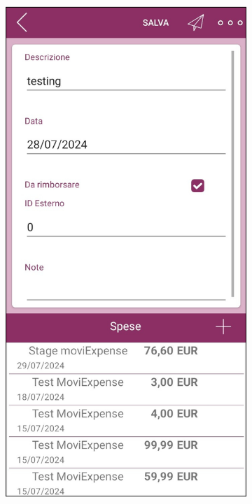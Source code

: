 \begin{figure}[H]
    \begin{subfigure}{.5\textwidth}
        \centering
        \includegraphics[width=.65\columnwidth]{images/screenshot/old/notaEditable.png}\vspace{2mm}
    \end{subfigure}
    \begin{subfigure}{.5\textwidth}
        \centering

\end{subfigure}
\end{figure}
